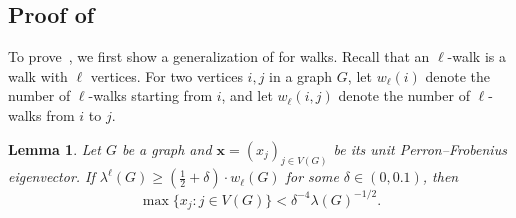 \documentclass[11pt,a4paper]{article}
\newtheorem{lemma}[theorem]{Lemma}
\theoremstyle{definition}
\theoremstyle{remark}
\begin{document}
\subsection{Proof of }  

To prove~, we first show a generalization of  for walks. 
Recall that an $\ell$-walk is a walk with $\ell$ vertices. 
For two vertices $i, j$ in a graph $G$, let $w_\ell(i)$ denote the number of $\ell$-walks starting from $i$, and let $w_\ell(i, j)$ denote the number of $\ell$-walks from $i$ to $j$.

\begin{lemma} \label{lem:max-II}
Let $G$ be a graph and $\bm{x}=(x_j)_{j\in V(G)}$ be its unit Perron--Frobenius eigenvector. If $\lambda^{\ell} (G) \ge \left(\frac{1}{2} + \delta\right) \cdot w_{\ell}(G)$ for some $\delta \in (0, 0.1)$, then 
\[ \max\{x_j : j \in V(G)\} < \delta^{-4}\lambda(G)^{-1/2}. \] 
\end{lemma}
\end{document}
